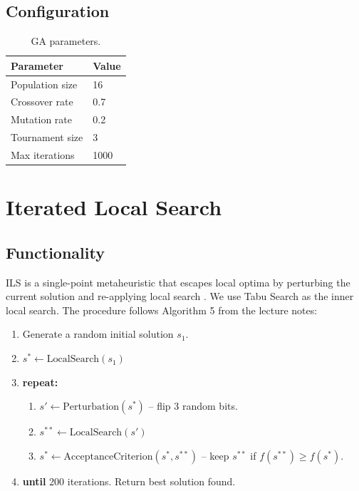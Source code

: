 \documentclass[12pt, a4paper]{article}
\begin{document}
\subsection{Configuration}

\begin{table}[h]
\centering
\begin{tabular}{ll}
\toprule
\textbf{Parameter} & \textbf{Value} \\
\midrule
Population size    & 16 \\
Crossover rate     & 0.7 \\
Mutation rate      & 0.2 \\
Tournament size    & 3 \\
Max iterations     & 1000 \\
\bottomrule
\end{tabular}
\caption{GA parameters.}
\end{table}

\section{Iterated Local Search}

\subsection{Functionality}

ILS is a single-point metaheuristic that escapes local optima by perturbing the current solution and re-applying local search \cite{notes}. We use Tabu Search as the inner local search. The procedure follows Algorithm 5 from the lecture notes:

\begin{enumerate}
    \item Generate a random initial solution $s_1$.
    \item $s^* \leftarrow \text{LocalSearch}(s_1)$
    \item \textbf{repeat:}
    \begin{enumerate}
        \item $s' \leftarrow \text{Perturbation}(s^*)$ -- flip 3 random bits.
        \item $s^{**} \leftarrow \text{LocalSearch}(s')$
        \item $s^* \leftarrow \text{AcceptanceCriterion}(s^*, s^{**})$ -- keep $s^{**}$ if $f(s^{**}) \geq f(s^*)$.
    \end{enumerate}
    \item \textbf{until} 200 iterations. Return best solution found.
\end{enumerate}
\end{document}
